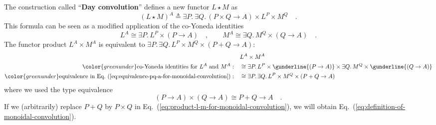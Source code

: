 The construction called \textsf{``}\textbf{Day convolution}\textsf{''}
defines a new functor $L\star M$ as 
\begin{equation}
\left(L\star M\right)^{A}\triangleq\exists P.\:\exists Q.\,\left(P\times Q\rightarrow A\right)\times L^{P}\times M^{Q}\quad.\label{eq:definition-of-monoidal-convolution}
\end{equation}
This formula can be seen as a modified application of the co-Yoneda
identities
\[
L^{A}\cong\exists P.\,L^{P}\times\left(P\rightarrow A\right)\quad,\quad\quad M^{A}\cong\exists Q.\,M^{Q}\times\left(Q\rightarrow A\right)\quad.
\]
The functor product $L^{A}\times M^{A}$ is equivalent to $\exists P.\,\exists Q.\,L^{P}\times M^{Q}\times\left(P+Q\rightarrow A\right)$:
\begin{align}
 & L^{A}\times M^{A}\nonumber \\
{\color{greenunder}\text{co-Yoneda identities for }L^{A}\text{ and }M^{A}:}\quad & \cong\exists P.\,L^{P}\times\gunderline{\left(P\rightarrow A\right)}\times\exists Q.\,M^{Q}\times\gunderline{\left(Q\rightarrow A\right)}\nonumber \\
{\color{greenunder}\text{equivalence in Eq.~(\ref{eq:equivalence-pq-a-for-monoidal-convolution})}:}\quad & \cong\exists P.\,\exists Q.\,L^{P}\times M^{Q}\times\left(P+Q\rightarrow A\right)\label{eq:product-l-m-for-monoidal-convolution}
\end{align}
where we used the type equivalence 
\begin{equation}
\left(P\rightarrow A\right)\times\left(Q\rightarrow A\right)\cong P+Q\rightarrow A\quad.\label{eq:equivalence-pq-a-for-monoidal-convolution}
\end{equation}
If we (arbitrarily) replace $P+Q$ by $P\times Q$ in Eq.~(\ref{eq:product-l-m-for-monoidal-convolution}),
we will obtain Eq.~(\ref{eq:definition-of-monoidal-convolution}).

